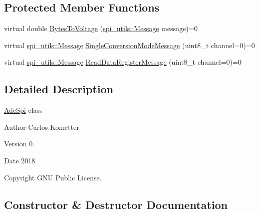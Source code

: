 \subsection*{Protected Member Functions}
\begin{DoxyCompactItemize}
\item 
virtual double \mbox{\hyperlink{classAdcSpi_a25a1deb55a9f0e71a405ca47a41f3804}{Bytes\+To\+Voltage}} (\mbox{\hyperlink{structspi__utils_1_1Message}{spi\+\_\+utils\+::\+Message}} message)=0
\item 
virtual \mbox{\hyperlink{structspi__utils_1_1Message}{spi\+\_\+utils\+::\+Message}} \mbox{\hyperlink{classAdcSpi_a369da36232861640a113792d2398ce44}{Single\+Conversion\+Mode\+Message}} (uint8\+\_\+t channel=0)=0
\item 
virtual \mbox{\hyperlink{structspi__utils_1_1Message}{spi\+\_\+utils\+::\+Message}} \mbox{\hyperlink{classAdcSpi_a3578f18e1976d9e2b075a3fbdc003517}{Read\+Data\+Register\+Message}} (uint8\+\_\+t channel=0)=0
\end{DoxyCompactItemize}


\subsection{Detailed Description}
\mbox{\hyperlink{classAdcSpi}{Adc\+Spi}} class \begin{DoxyAuthor}{Author}
Carlos Kometter 
\end{DoxyAuthor}
\begin{DoxyVersion}{Version}
0. 
\end{DoxyVersion}
\begin{DoxyDate}{Date}
2018 
\end{DoxyDate}
\begin{DoxyCopyright}{Copyright}
G\+NU Public License. 
\end{DoxyCopyright}


\subsection{Constructor \& Destructor Documentation}
\mbox{\label{classAdcSpi_a3c66ca397c2a9d0a7c475ee551b3c388}} 
